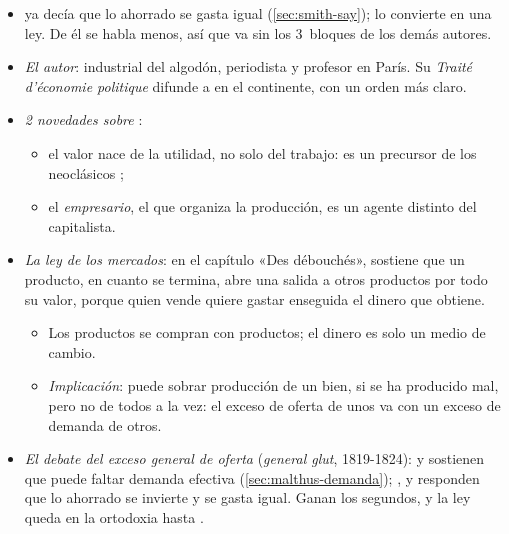 \documentclass[11pt]{article}
\begin{document}
\begin{itemize}
\item {} ya decía que lo ahorrado se gasta igual (\ref{sec:smith-say});  lo convierte en una ley. De él se habla menos, así que va sin los 3~bloques de los demás autores.
\item \emph{El autor}: industrial del algodón, periodista y profesor en París. Su \emph{Traité d'économie politique}\nocite{Say1803Traite} difunde a  en el continente, con un orden más claro.
\item \emph{2 novedades sobre }:
  \begin{itemize}
  \item el valor nace de la utilidad, no solo del trabajo: es un precursor de los neoclásicos ;
  \item el \emph{empresario}, el que organiza la producción, es un agente distinto del capitalista.
  \end{itemize}
\item \emph{La ley de los mercados}: en el capítulo «Des débouchés»,  sostiene que un producto, en cuanto se termina, abre una salida a otros productos por todo su valor, porque quien vende quiere gastar enseguida el dinero que obtiene\nocite{Say1803Traite}.
  \begin{itemize}
  \item Los productos se compran con productos; el dinero es solo un medio de cambio.
  \item \emph{Implicación}: puede sobrar producción de un bien, si se ha producido mal, pero no de todos a la vez: el exceso de oferta de unos va con un exceso de demanda de otros.
  \end{itemize}
\item \emph{El debate del exceso general de oferta} (\emph{general glut}, 1819-1824): \nocite{Sismondi1819Nouveaux} y \nocite{Malthus1820Principles} sostienen que puede faltar demanda efectiva (\ref{sec:malthus-demanda}); \nocite{Say1820Lettres},  y  responden que lo ahorrado se invierte y se gasta igual. Ganan los segundos, y la ley queda en la ortodoxia hasta  .
\end{itemize}
\end{document}

